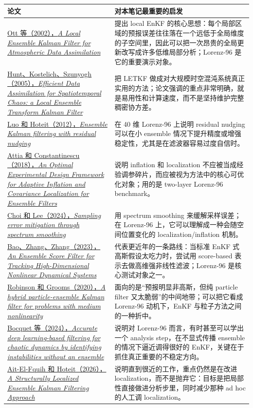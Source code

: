 \documentclass[12pt,a4paper]{ctexart}
\begin{document}
\begin{longtable}{>{\raggedright\arraybackslash}p{4.3cm} >{\raggedright\arraybackslash}p{9.1cm}}
\toprule
论文 & 对本笔记最重要的启发 \\
\midrule
\endhead
\href{https://arxiv.org/abs/physics/0203058}{Ott 等（2002），\emph{A Local Ensemble Kalman Filter for Atmospheric Data Assimilation}} & 提出 local EnKF 的核心思想：每个局部区域的预报误差往往落在一个远低于全局维度的子空间里，因此可以把一次昂贵的全局更新改写成许多低维局部分析；Lorenz-96 是它的重要演示对象。 \\
\href{https://arxiv.org/abs/physics/0511236}{Hunt、Kostelich、Szunyogh（2005），\emph{Efficient Data Assimilation for Spatiotemporal Chaos: a Local Ensemble Transform Kalman Filter}} & 把 LETKF 做成对大规模时空混沌系统真正实用的方法；论文强调的重点非常明确，就是易用性和计算速度，而不是坚持维护完整稠密协方差。 \\
\href{https://arxiv.org/abs/1210.1318}{Luo 和 Hoteit（2012），\emph{Ensemble Kalman filtering with residual nudging}} & 在 40 维 Lorenz-96 上说明 residual nudging 可以在小 ensemble 情况下提升精度或增强稳定性，尤其是在滤波器容易过度自信时。 \\
\href{https://arxiv.org/abs/1806.10655}{Attia 和 Constantinescu（2018），\emph{An Optimal Experimental Design Framework for Adaptive Inflation and Covariance Localization for Ensemble Filters}} & 说明 inflation 和 localization 不应被当成经验调参碎片，而应被视为方法中的核心可优化对象；用的是 two-layer Lorenz-96 benchmark。 \\
\href{https://arxiv.org/abs/2404.00154}{Choi 和 Lee（2024），\emph{Sampling error mitigation through spectrum smoothing}} & 用 spectrum smoothing 来缓解采样误差；在 Lorenz-96 上，它可以理解成一种会随空间位置变化的 localization/inflation 机制。 \\
\href{https://arxiv.org/abs/2309.00983}{Bao、Zhang、Zhang（2023），\emph{An Ensemble Score Filter for Tracking High-Dimensional Nonlinear Dynamical Systems}} & 代表更近年的一条路线：当标准 EnKF 式高斯假设太吃力时，尝试用 score-based 表示去做高维强非线性滤波；Lorenz-96 是核心测试对象之一。 \\
\href{https://arxiv.org/abs/2006.04699}{Robinson 和 Grooms（2020），\emph{A hybrid particle-ensemble Kalman filter for problems with medium nonlinearity}} & 面向的是“预报明显非高斯，但纯 particle filter 又太脆弱”的中间地带；可以把它看成 Lorenz-96 动机下，EnKF 与粒子方法之间的一种折中。 \\
\href{https://arxiv.org/abs/2408.04739}{Bocquet 等（2024），\emph{Accurate deep learning-based filtering for chaotic dynamics by identifying instabilities without an ensemble}} & 说明对 Lorenz-96 而言，有时甚至可以学出一个 analysis step，在不显式传播 ensemble 的情况下逼近调得很好的 EnKF，关键在于抓住真正重要的不稳定方向。 \\
\href{https://arxiv.org/abs/2603.03926}{Ait-El-Fquih 和 Hoteit（2026），\emph{A Structurally Localized Ensemble Kalman Filtering Approach}} & 说明直到很近的工作，重点仍然是在改进 localization，而不是抛弃它：目标是把局部性直接做进分析步里，同时减少那种 ad hoc 的人工调 localization。 \\
\bottomrule
\end{longtable}
\end{document}
